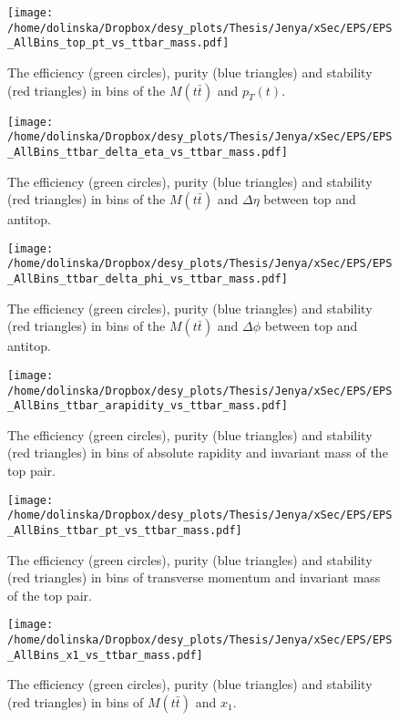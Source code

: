 \begin{figure}[p]
  \centering
  \texttt{[image: /home/dolinska/Dropbox/desy\_plots/Thesis/Jenya/xSec/EPS/EPS\_AllBins\_top\_pt\_vs\_ttbar\_mass.pdf]}
  \caption{The efficiency (green circles), purity (blue triangles) and stability (red triangles) in bins of the $M(t\bar{t})$ and $p_{T}(t)$.}
  \label{fig:EPS_2D_Mtt_pt}
\end{figure}

\begin{figure}[p]
  \centering
  \texttt{[image: /home/dolinska/Dropbox/desy\_plots/Thesis/Jenya/xSec/EPS/EPS\_AllBins\_ttbar\_delta\_eta\_vs\_ttbar\_mass.pdf]}
  \caption{The efficiency (green circles), purity (blue triangles) and stability (red triangles) in bins of the $M(t\bar{t})$ and $\Delta\eta$ between top and antitop.}
  \label{fig:EPS_2D_Mtt_eta}
\end{figure}

\begin{figure}[p]
  \centering
  \texttt{[image: /home/dolinska/Dropbox/desy\_plots/Thesis/Jenya/xSec/EPS/EPS\_AllBins\_ttbar\_delta\_phi\_vs\_ttbar\_mass.pdf]}
  \caption{The efficiency (green circles), purity (blue triangles) and stability (red triangles) in bins of the $M(t\bar{t})$ and $\Delta\phi$ between top and antitop.}
  \label{fig:EPS_2D_Mtt_phi}
\end{figure}

\begin{figure}[p]
  \centering
  \texttt{[image: /home/dolinska/Dropbox/desy\_plots/Thesis/Jenya/xSec/EPS/EPS\_AllBins\_ttbar\_arapidity\_vs\_ttbar\_mass.pdf]}
  \caption{The efficiency (green circles), purity (blue triangles) and stability (red triangles) in bins of absolute rapidity and invariant mass of the top pair.}
  \label{fig:EPS_2D_ytt_Mtt}
\end{figure}

\begin{figure}[p]
  \centering
  \texttt{[image: /home/dolinska/Dropbox/desy\_plots/Thesis/Jenya/xSec/EPS/EPS\_AllBins\_ttbar\_pt\_vs\_ttbar\_mass.pdf]}
  \caption{The efficiency (green circles), purity (blue triangles) and stability (red triangles) in bins of transverse momentum and invariant mass of the top pair.}
  \label{fig:EPS_2D_pttt_Mtt}
\end{figure}


\begin{figure}[p]
  \centering
  \texttt{[image: /home/dolinska/Dropbox/desy\_plots/Thesis/Jenya/xSec/EPS/EPS\_AllBins\_x1\_vs\_ttbar\_mass.pdf]}
  \caption{The efficiency (green circles), purity (blue triangles) and stability (red triangles) in bins of $M(t\bar{t})$ and  $x_{1}$.}
  \label{fig:EPS_2D_Mtt_x1}
\end{figure}